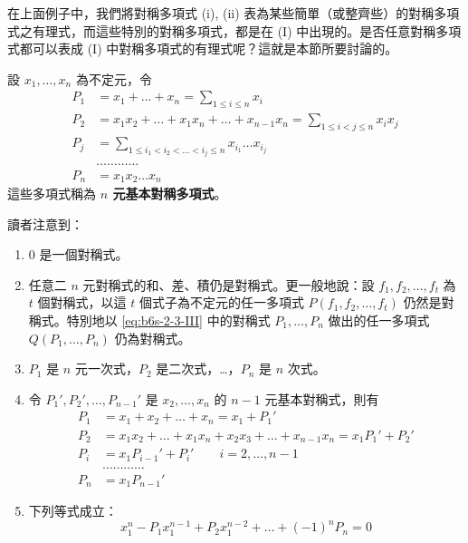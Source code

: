 在上面例子中，我們將對稱多項式 (i), (ii) 表為某些簡單（或整齊些）的對稱多項式之有理式，而這些特別的對稱多項式，都是在 (I) 中出現的。是否任意對稱多項式都可以表成 (I) 中對稱多項式的有理式呢？這就是本節所要討論的。

設 $x_1, \dots, x_n$ 為不定元，令
\begin{equation}
\begin{aligned}
P_1 &= x_1 + \dots + x_n = \sum_{1 \le i \le n} x_i \\
P_2 &= x_1 x_2 + \dots + x_1 x_n + \dots + x_{n-1} x_n = \sum_{1 \le i < j \le n} x_i x_j \\
P_j &= \sum_{1 \le i_1 < i_2 < \dots < i_j \le n} x_{i_1}\dots x_{i_j} \\
&\dots\dots\dots\dots \\
P_n &= x_1 x_2 \dots x_n
\end{aligned} \tag{III} \label{eq:b6s-2-3-III}
\end{equation}
這些多項式稱為 \textbf{$n$ 元基本對稱多項式}。

讀者注意到：
\begin{enumerate}[label=(\arabic*), leftmargin=2em]
  \item 0 是一個對稱式。
  \item 任意二 $n$ 元對稱式的和、差、積仍是對稱式。更一般地說：設 $f_1, f_2, \dots, f_t$ 為 $t$ 個對稱式，以這 $t$ 個式子為不定元的任一多項式 $P(f_1, f_2, \dots, f_t)$ 仍然是對稱式。特別地以 \eqref{eq:b6s-2-3-III} 中的對稱式 $P_1, \dots, P_n$ 做出的任一多項式 $Q(P_1, \dots, P_n)$ 仍為對稱式。
  \item $P_1$ 是 $n$ 元一次式，$P_2$ 是二次式，\dots，$P_n$ 是 $n$ 次式。
  \item 令 $P_1', P_2', \dots, P_{n-1}'$ 是 $x_2, \dots, x_n$ 的 $n-1$ 元基本對稱式，則有
  \begin{equation}
  \begin{aligned}
  P_1 &= x_1 + x_2 + \dots + x_n = x_1 + P_1' \\
  P_2 &= x_1 x_2 + \dots + x_1 x_n + x_2 x_3 + \dots + x_{n-1} x_n = x_1 P_1' + P_2' \\
  P_i &= x_1 P_{i-1}' + P_i' \qquad i=2, \dots, n-1 \\
  &\dots\dots\dots\dots \\
  P_n &= x_1 P_{n-1}'
  \end{aligned} \tag{IV} \label{eq:b6s-2-3-IV}
  \end{equation}
  \item 下列等式成立：
  \begin{equation}
  x_1^n - P_1 x_1^{n-1} + P_2 x_1^{n-2} + \dots + (-1)^n P_n = 0 \tag{V} \label{eq:b6s-2-3-V}
  \end{equation}
\end{enumerate}

